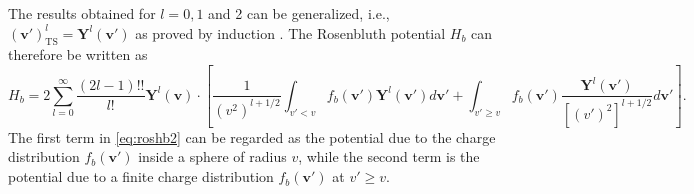 %
The results obtained for $l=0,1$ and 2 can be generalized, i.e., $(\mathbf v')^l_{\text{TS}}=\mathbf Y^{l}(\mathbf v')$ as proved by induction \citep{Weinert1980}.
%
The Rosenbluth potential $H_b$ can therefore be written as
%
\begin{equation}
    H_b = 2 \sum_{l=0}^\infty \frac{(2l-1)!!}{l!}\mathbf Y^{l}(\mathbf v) \cdot \left[\frac{1}{(v^{2})^{l+1/2}} \int_{v'<v} f_b(\mathbf v') \mathbf Y^{l}(\mathbf v') d\mathbf v'+ \int_{v'\ge v} f_b(\mathbf v') \frac{\mathbf Y^{l}(\mathbf v')}{[(v')^{2}]^{l+1/2}}  d\mathbf v'\right].
\label{eq:roshb2}
\end{equation}
%
The first term in \cref{eq:roshb2} can be regarded as the potential due to the charge distribution $f_b(\mathbf v')$ inside a sphere of radius $v$, while the second term is the potential due to a finite charge distribution $f_b(\mathbf v')$ at $v'\ge v$.

